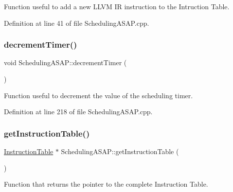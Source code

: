 Function useful to add a new L\+L\+VM IR instruction to the Intruction Table. 



Definition at line 41 of file Scheduling\+A\+S\+A\+P.\+cpp.

\mbox{\label{classoctantis_1_1SchedulingASAP_a32cbd30ee5e9591898edf498c03ddfaf}} 
\subsubsection{\texorpdfstring{decrement\+Timer()}{decrementTimer()}}
{\footnotesize\ttfamily void Scheduling\+A\+S\+A\+P\+::decrement\+Timer (\begin{DoxyParamCaption}{ }\end{DoxyParamCaption})}



Function useful to decrement the value of the scheduling timer. 



Definition at line 218 of file Scheduling\+A\+S\+A\+P.\+cpp.

\mbox{\label{classoctantis_1_1SchedulingASAP_a2aae2d1a8c0482012ac781faf0a7fd42}} 
\subsubsection{\texorpdfstring{get\+Instruction\+Table()}{getInstructionTable()}}
{\footnotesize\ttfamily \hyperlink{classoctantis_1_1InstructionTable}{Instruction\+Table} $\ast$ Scheduling\+A\+S\+A\+P\+::get\+Instruction\+Table (\begin{DoxyParamCaption}{ }\end{DoxyParamCaption})}



Function that returns the pointer to the complete Instruction Table. 



